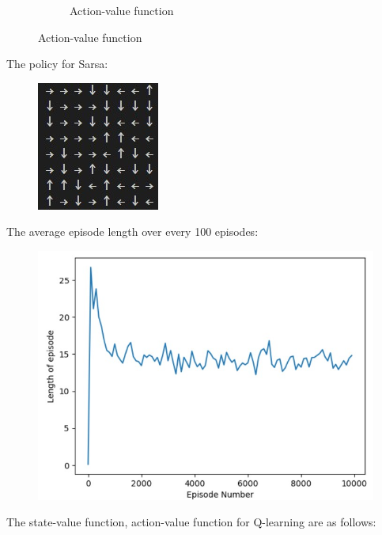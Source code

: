 \documentclass{article}
\begin{document}
\begin{enumerate}
\begin{figure}[H]
\begin{subfigure}[b]{0.5\linewidth}
		\caption{Action-value function}
	\end{subfigure}
\end{figure}
The policy for Sarsa:
\begin{figure}[H]
	\centering
	\includegraphics{SarsaPolicy3.jpg}
\end{figure}
The average episode length over every 100 episodes:
\begin{figure}[H]
	\centering
	\includegraphics[scale = 0.5]{SarsaPlot3.jpg}
\end{figure}
The state-value function, action-value function for Q-learning are as follows:
\begin{figure}[H]
	\begin{subfigure}[b]{0.5\linewidth}

\end{subfigure}
\end{figure}
\end{enumerate}
\end{document}
